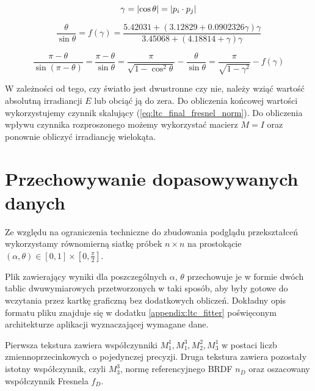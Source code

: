 \documentclass[../main.tex]{subfiles}
\begin{document}
\begin{equation}
\gamma = \abs{\cos\theta} = \abs{p_i \cdot p_j}
\label{eq:ltc_gamma_def}
\end{equation}

\begin{equation}
\frac{\theta}{\sin\theta} = f(\gamma) = \frac{
    5.42031 + \left( 3.12829 + 0.0902326 \gamma \right) \gamma
}{
    3.45068 + \left( 4.18814 + \gamma \right) \gamma
}
\label{ltc_gamma_approx_positive}
\end{equation}

\begin{equation}
    \frac{\pi - \theta}{\sin\left( \pi-\theta \right)} =
    \frac{\pi - \theta}{\sin\theta} = 
    \frac{\pi}{\sqrt{1-\cos^{2}\theta}} - \frac{\theta}{\sin\theta} =
    \frac{\pi}{\sqrt{1-\gamma^2}} - f(\gamma)
\label{ltc_gamma_approx_negative}
\end{equation}

W zależności od tego, czy światło jest dwustronne czy nie, należy wziąć wartość absolutną irradiancji $E$ lub obciąć ją do zera. Do obliczenia końcowej wartości wykorzystujemy czynnik skalujący (\ref{eq:ltc_final_fresnel_norm}). Do obliczenia wpływu czynnika rozproszonego możemy wykorzystać macierz $M = I$ oraz ponownie obliczyć irradiancję wielokąta.

\section{Przechowywanie dopasowywanych danych}

Ze względu na ograniczenia techniczne do zbudowania podglądu przekształceń wykorzystamy równomierną siatkę próbek $n \times n$ na prostokącie $(\alpha, \theta) \in \left[0,1\right] \times \left[0, \frac{\pi}{2}\right]$.

Plik zawierający wyniki dla poszczególnych $\alpha$, $\theta$ przechowuje je w formie dwóch tablic dwuwymiarowych przetworzonych w taki sposób, aby były gotowe do wczytania przez kartkę graficzną bez dodatkowych obliczeń. Dokładny opis formatu pliku znajduje się w dodatku \ref{appendix:ltc_fitter} poświęconym architekturze aplikacji wyznaczającej wymagane dane.

Pierwsza tekstura zawiera współczynniki $M_{1}^{1}, M_{1}^{3}, M_{2}^{2}, M_{3}^{1}$ w postaci liczb zmiennoprzecinkowych o pojedynczej precyzji. Druga tekstura zawiera pozostały istotny współczynnik, czyli $M_{3}^{3}$, normę referencyjnego BRDF $n_D$ oraz oszacowany współczynnik Fresnela $f_D$.
\end{document}
